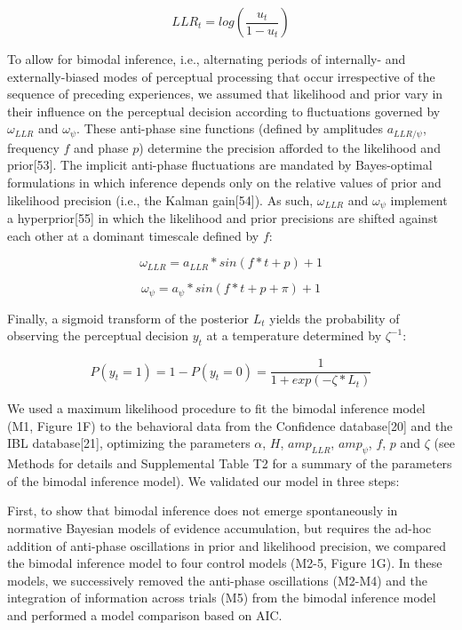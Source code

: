 \documentclass[
]{article}
\begin{document}
\begin{equation}
LLR_t = log(\frac{u_t}{1-u_t})
\end{equation}

To allow for bimodal inference, i.e., alternating periods of internally-
and externally-biased modes of perceptual processing that occur
irrespective of the sequence of preceding experiences, we assumed that
likelihood and prior vary in their influence on the perceptual decision
according to fluctuations governed by \(\omega_{LLR}\) and
\(\omega_{\psi}\). These anti-phase sine functions (defined by
amplitudes \(a_{LLR/\psi}\), frequency \(f\) and phase \(p\)) determine
the precision afforded to the likelihood and prior{[}53{]}. The implicit
anti-phase fluctuations are mandated by Bayes-optimal formulations in
which inference depends only on the relative values of prior and
likelihood precision (i.e., the Kalman gain{[}54{]}). As such,
\(\omega_{LLR}\) and \(\omega_{\psi}\) implement a hyperprior{[}55{]} in
which the likelihood and prior precisions are shifted against each other
at a dominant timescale defined by \(f\):

\begin{equation}
\omega_{LLR} = a_{LLR} * sin(f * t + p) + 1
\end{equation}

\begin{equation}
\omega_{\psi} = a_{\psi} * sin(f * t + p + \pi) + 1
\end{equation}

Finally, a sigmoid transform of the posterior \(L_t\) yields the
probability of observing the perceptual decision \(y_t\) at a
temperature determined by \(\zeta^{-1}\):

\begin{equation}
P(y_t = 1) = 1 - P(y_t = 0) = \frac{1}{1 + exp(-\zeta * L_t)}
\end{equation}

We used a maximum likelihood procedure to fit the bimodal inference
model (M1, Figure 1F) to the behavioral data from the Confidence
database{[}20{]} and the IBL database{[}21{]}, optimizing the parameters
\(\alpha\), \(H\), \(amp_{LLR}\), \(amp_{\psi}\), \(f\), \(p\) and
\(\zeta\) (see Methods for details and Supplemental Table T2 for a
summary of the parameters of the bimodal inference model). We validated
our model in three steps:

First, to show that bimodal inference does not emerge spontaneously in
normative Bayesian models of evidence accumulation, but requires the
ad-hoc addition of anti-phase oscillations in prior and likelihood
precision, we compared the bimodal inference model to four control
models (M2-5, Figure 1G). In these models, we successively removed the
anti-phase oscillations (M2-M4) and the integration of information
across trials (M5) from the bimodal inference model and performed a
model comparison based on AIC.
\end{document}
